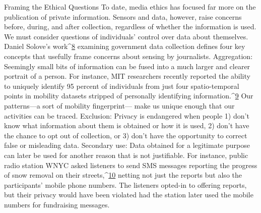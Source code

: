 Framing the Ethical Questions
To date, media ethics has focused far more on the publication of private
information. Sensors and data, however, raise concerns before, during, and
after collection, regardless of whether the information is used. We must
consider questions of individuals' control over data about themselves. Daniel
Solove's work^{\href{#endnotes-culver}{8}} examining government data collection defines four key
concepts that usefully frame concerns about sensing by journalists.
Aggregation: Seemingly small bits of information can be fused into a
much larger and clearer portrait of a person. For instance, MIT researchers
recently reported the ability to uniquely identify 95 percent of individuals
from just four spatio-temporal points in mobility datasets stripped of personally
identifying information.^{\href{#endnotes-culver}{9}} Our patterns—a sort of mobility fingerprint—
make us unique enough that our activities can be traced.
Exclusion: Privacy is endangered when people 1) don't know what information
about them is obtained or how it is used, 2) don't have the chance
to opt out of collection, or 3) don't have the opportunity to correct false or
misleading data.
Secondary use: Data obtained for a legitimate purpose can later be used
for another reason that is not justifiable. For instance, public radio station
WNYC asked listeners to send SMS messages reporting the progress of
snow removal on their streets,^{\href{#endnotes-culver}{10}} netting not just the reports but also the participants'
mobile phone numbers. The listeners opted-in to offering reports,
but their privacy would have been violated had the station later used the
mobile numbers for fundraising messages.

